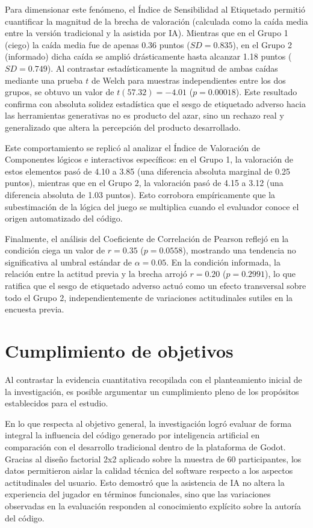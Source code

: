 Para dimensionar este fenómeno, el Índice de Sensibilidad al Etiquetado permitió cuantificar la magnitud de la brecha de valoración (calculada como la caída media entre la versión tradicional y la asistida por IA). Mientras que en el Grupo 1 (ciego) la caída media fue de apenas 0.36 puntos ($SD = 0.835$), en el Grupo 2 (informado) dicha caída se amplió drásticamente hasta alcanzar 1.18 puntos ($SD = 0.749$). Al contrastar estadísticamente la magnitud de ambas caídas mediante una prueba $t$ de Welch para muestras independientes entre los dos grupos, se obtuvo un valor de $t(57.32) = -4.01$ ($p = 0.00018$). Este resultado confirma con absoluta solidez estadística que el sesgo de etiquetado adverso hacia las herramientas generativas no es producto del azar, sino un rechazo real y generalizado que altera la percepción del producto desarrollado.

Este comportamiento se replicó al analizar el Índice de Valoración de Componentes lógicos e interactivos específicos: en el Grupo 1, la valoración de estos elementos pasó de 4.10 a 3.85 (una diferencia absoluta marginal de 0.25 puntos), mientras que en el Grupo 2, la valoración pasó de 4.15 a 3.12 (una diferencia absoluta de 1.03 puntos). Esto corrobora empíricamente que la subestimación de la lógica del juego se multiplica cuando el evaluador conoce el origen automatizado del código. 

Finalmente, el análisis del Coeficiente de Correlación de Pearson reflejó en la condición ciega un valor de $r = 0.35$ ($p = 0.0558$), mostrando una tendencia no significativa al umbral estándar de $\alpha = 0.05$. En la condición informada, la relación entre la actitud previa y la brecha arrojó $r = 0.20$ ($p = 0.2991$), lo que ratifica que el sesgo de etiquetado adverso actuó como un efecto transversal sobre todo el Grupo 2, independientemente de variaciones actitudinales sutiles en la encuesta previa.

\section{Cumplimiento de objetivos}

Al contrastar la evidencia cuantitativa recopilada con el planteamiento inicial de la investigación, es posible argumentar un cumplimiento pleno de los propósitos establecidos para el estudio.

En lo que respecta al objetivo general, la investigación logró evaluar de forma integral la influencia del código generado por inteligencia artificial en comparación con el desarrollo tradicional dentro de la plataforma de Godot. Gracias al diseño factorial 2x2 aplicado sobre la muestra de 60 participantes, los datos permitieron aislar la calidad técnica del software respecto a los aspectos actitudinales del usuario. Esto demostró que la asistencia de IA no altera la experiencia del jugador en términos funcionales, sino que las variaciones observadas en la evaluación responden al conocimiento explícito sobre la autoría del código.

